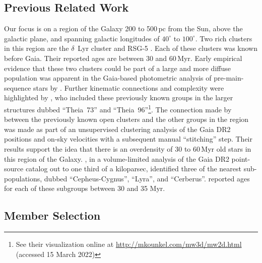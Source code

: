 \documentclass[12pt,twocolumn,tighten,linenumbers,trackchanges]{aastex63}
\begin{document}
\subsection{Previous Related Work}

Our focus is on a region of the Galaxy 200 to 500\,pc
from the Sun, above the galactic plane, and spanning galactic
longitudes of $40^\circ$ to $100^\circ$.  Two rich clusters in
this region are the $\delta$\ Lyr cluster
\citep{stephenson_possible_1959} and RSG-5 \citep{roser_nine_2016}.
Each of these clusters was known before Gaia.  Their reported ages are
between 30 and 60\,Myr.  Early empirical evidence that these two
clusters could be part of a large and more diffuse population was
apparent in the Gaia-based photometric analysis of pre-main-sequence
stars by \citet[][see their Figures~11 and~13]{Zari2018}.  Further
kinematic connections and complexity were highlighted by
\citet{KounkelCovey2019}, who included these previously known groups
in the larger structures dubbed ``Theia~73'' and
``Theia~96''\footnote{See their visualization online at
\url{http://mkounkel.com/mw3d/mw2d.html} (accessed 15 March 2022)}.
The connection made by \citet{KounkelCovey2019} between the previously
known open clusters and the other groups in the region was made as
part of an unsupervised clustering analysis of the Gaia DR2 positions
and on-sky velocities with a subsequent manual ``stitching'' step.
Their results support the idea that there is an overdensity of 30 to
60\,Myr old stars in this region of the Galaxy.  \citet{Kerr2021}, in
a volume-limited analysis of the Gaia DR2 point-source catalog out to
one third of a kiloparsec, identified three of the nearest
sub-populations, dubbed ``Cepheus-Cygnus'', ``Lyra'', and
``Cerberus''.  \citet{Kerr2021} reported ages for each of these
subgroups between 30 and 35 Myr.


\subsection{Member Selection}
\label{subsec:members}
\end{document}

